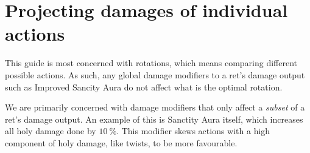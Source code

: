 
\section{Projecting damages of individual actions}

This guide is most concerned with rotations, which means comparing different possible actions.
As such, any global damage modifiers to a ret's damage output such as Improved Sancity Aura do not affect what is the optimal rotation.

We are primarily concerned with damage modifiers that only affect a \emph{subset} of a ret's damage output.
An example of this is Sanctity Aura itself, which increases all holy damage done by $10~\%$.
This modifier skews actions with a high component of holy damage, like twists, to be more favourable.

